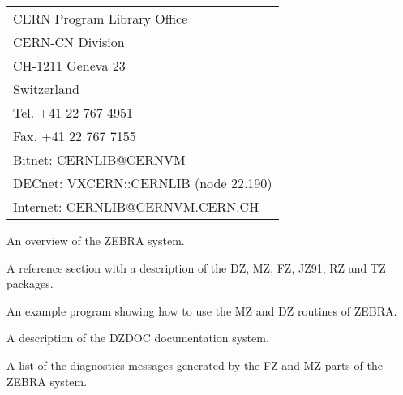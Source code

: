 \newpage

{\samepage \clearpage \begin{tabular}{l}
CERN Program Library Office              \\  
CERN-CN Division                         \\  
CH-1211 Geneva 23                        \\  
Switzerland                              \\  
Tel.      +41 22 767 4951                \\  
Fax.      +41 22 767 7155                \\  
Bitnet:   CERNLIB@CERNVM                 \\  
DECnet:   VXCERN::CERNLIB (node 22.190)  \\  
Internet: CERNLIB@CERNVM.CERN.CH
\end{tabular}
}


\newpage

{\samepage \clearpage \begin{UL}%
\item An overview of the ZEBRA system.
\item A reference section with a description of the DZ, MZ, FZ, 
      JZ91, RZ and TZ packages.
\item An example program showing how to use the MZ and DZ routines of ZEBRA.
\item A description of the DZDOC documentation system.
\item A list of the diagnostics messages generated by the FZ and MZ
      parts of the ZEBRA system.
\end{UL}
}



